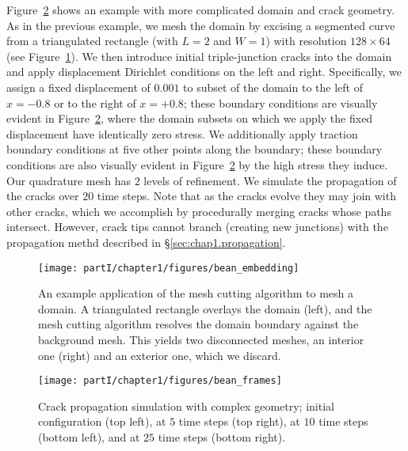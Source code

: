 Figure~\ref{fig:chap1.examples.propagation.bean} shows an example with more complicated domain and crack geometry. As in the previous example, we mesh the domain by excising a segmented curve from a triangulated rectangle (with $L = 2$ and $W = 1$) with resolution $128 \times 64$ (see Figure~\ref{fig:chap1.examples.propagation.bean.embedding}). We then introduce initial triple-junction cracks into the domain and apply displacement Dirichlet conditions on the left and right. Specifically, we assign a fixed displacement of $0.001$ to subset of the domain to the left of $x = -0.8$ or to the right of $x = +0.8$; these boundary conditions are visually evident in Figure~\ref{fig:chap1.examples.propagation.bean}, where the domain subsets on which we apply the fixed displacement have identically zero stress. We additionally apply traction boundary conditions at five other points along the boundary; these boundary conditions are also visually evident in Figure~\ref{fig:chap1.examples.propagation.bean} by the high stress they induce. Our quadrature mesh has $2$ levels of refinement. We simulate the propagation of the cracks over $20$ time steps. Note that as the cracks evolve they may join with other cracks, which we accomplish by procedurally merging cracks whose paths intersect. However, crack tips cannot branch (creating new junctions) with the propagation methd described in \S\ref{sec:chap1.propagation}.

\setlength{\figurewidth}{\textwidth}
\begin{figure}[htbp]
\centering
\texttt{[image: partI/chapter1/figures/bean\_embedding]}
\caption{An example application of the mesh cutting algorithm to mesh a domain. A triangulated rectangle overlays the domain (left), and the mesh cutting algorithm resolves the domain boundary against the background mesh. This yields two disconnected meshes, an interior one (right) and an exterior one, which we discard.}
\label{fig:chap1.examples.propagation.bean.embedding}
\end{figure}

\setlength{\figurewidth}{\textwidth}
\begin{figure}[htbp]
\centering
\texttt{[image: partI/chapter1/figures/bean\_frames]}
\caption{Crack propagation simulation with complex geometry; initial configuration (top left), at $5$ time steps (top right), at $10$ time steps (bottom left), and at $25$ time steps (bottom right).}
\label{fig:chap1.examples.propagation.bean}
\end{figure}

